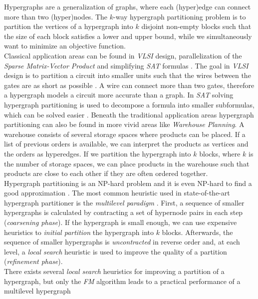 Hypergraphs are a generalization of graphs, where each (hyper)edge can connect 
more than two (hyper)nodes. The $k$-way hypergraph partitioning problem is to 
partition the vertices of a hypergraph into $k$ disjoint non-empty blocks such
that the size of each block satisfies a lower and upper bound, while we simultaneously 
want to minimize an objective function. \\
Classical application areas can be found in \emph{VLSI} design, parallelization of
the \emph{Sparse Matrix-Vector Product} and simplifying \emph{SAT} formulas 
\cite{karypis1999multilevel, mann2014formula, papa2007hypergraph}. The goal 
in \emph{VLSI} design is to partition a circuit into smaller units such that
the wires between the gates are as short as possible \cite{bulucc2016recent}.
A wire can connect more than two gates, therefore a hypergraph models a circuit more
accurate than a graph. In \emph{SAT} solving hypergraph partitioning is used to
decompose a formula into smaller subformulas, which can be solved easier \cite{mann2014formula}.
Beneath the traditional application areas hypergraph partitioning can also be found
in more vivid areas like \emph{Warehouse Planning}. A warehouse consists of several
storage spaces where products can be placed. If a list of previous orders is available, 
we can interpret the products as vertices and the orders as hyperedges. If we
partition the hypergraph into $k$ blocks, where $k$ is the number of storage spaces,
we can place products in the warehouse such that products are close to each other if
they are often ordered together.\\
Hypergraph partitioning is an NP-hard problem \cite{lengauer2012combinatorial} and
it is even NP-hard to find a good approximation \cite{bui1992finding}.
The most common heuristic used in state-of-the-art hypergraph partitioner is the
\emph{multilevel paradigm} \cite{catalyurek1999hypergraph, heuer2017improving, karypis1999multilevel}.
First, a sequence of smaller hypergraphs is calculated by contracting a set of hypernode pairs
in each step (\emph{coarsening phase}). If the hypergraph is small enough, we can use expensive
heuristics to \emph{initial partition} the hypergraph into $k$ blocks. Afterwards, the sequence
of smaller hypergraphs is \emph{uncontracted} in reverse order and, at each level, a 
\emph{local search} heuristic is used to improve the quality of a partition 
(\emph{refinement phase}). \\
There exists several \emph{local search} heuristics for improving a partition of a hypergraph,
but only the \emph{FM} algorithm leads to a practical performance of a multilevel hypergraph
